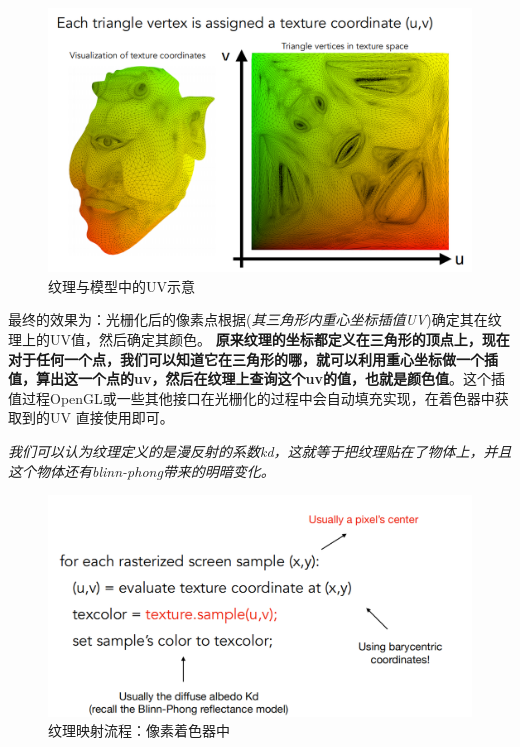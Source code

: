 \documentclass[UTF8,a4paper,12pt]{ctexbook}
\begin{document}
		\begin{figure}[H]
			\centering
			\includegraphics[width=\linewidth]{TextureMapping03}
			\caption{纹理与模型中的UV示意}
		\end{figure}
		
		最终的效果为：光栅化后的像素点根据(\textit{其三角形内重心坐标插值UV})确定其在纹理上的UV值，然后确定其颜色。
		\textbf{原来纹理的坐标都定义在三角形的顶点上，现在对于任何一个点，我们可以知道它在三角形的哪，就可以利用重心坐标做一个插值，算出这一个点的uv，然后在纹理上查询这个uv的值，也就是颜色值}。这个插值过程OpenGL或一些其他接口在光栅化的过程中会自动填充实现，在着色器中获取到的UV 直接使用即可。
		
		\textit{我们可以认为纹理定义的是漫反射的系数kd，这就等于把纹理贴在了物体上，并且这个物体还有blinn-phong带来的明暗变化。}
		
		\begin{figure}[H]
			\centering
			\includegraphics[width=\linewidth]{TextureMapping04}
			\caption{纹理映射流程：像素着色器中}
		\end{figure}

	
\end{document}
